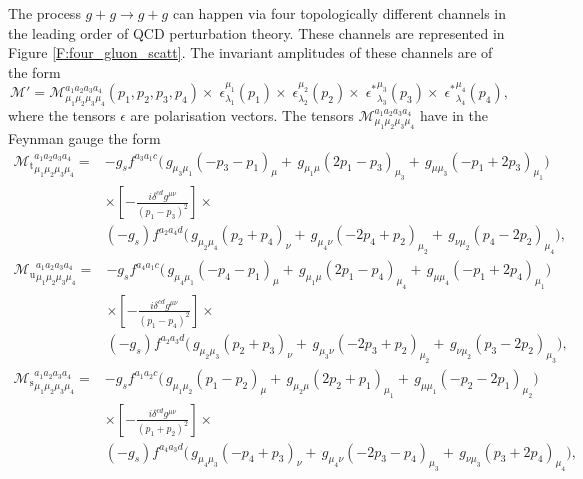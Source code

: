 \documentclass[a4paper, twoside, english, 12pt]{report}
\begin{document}
The process $g+g\rightarrow g+g$ can happen via four topologically different channels in the leading order of QCD perturbation theory. These channels are represented in Figure \ref{F:four_gluon_scatt}. The invariant amplitudes of these channels are of the form
\begin{equation}
\mathcal{M}'=\mathcal{M}_{\mu_1\mu_2\mu_3\mu_4}^{a_1a_2a_3a_4}(p_1,p_2,p_3,p_4)\times\; \epsilon_{\lambda_1}^{\mu_1}(p_1)\times\; \epsilon_{\lambda_2}^{\mu_2}(p_2)\times\; {\epsilon^*}_{\lambda_3}^{\mu_3}(p_3)\times\; {\epsilon^*}_{\lambda_4}^{\mu_4}(p_4),
\end{equation}
where the tensors $\epsilon$ are polarisation vectors. The tensors $\mathcal{M}_{\mu_1\mu_2\mu_3\mu_4}^{a_1a_2a_3a_4}$ have in the Feynman gauge the form
\begin{align*}
{\mathcal{M}_\text{t}}_{\mu_1\mu_2\mu_3\mu_4}^{a_1a_2a_3a_4} = &-g_sf^{a_3a_1c}\Big(\,g_{\mu_3\mu_1}(-{p_3}-{p_1})_{\mu} + \,g_{\mu_1\mu}(2{p_1}-{p_3})_{\mu_3} + \,g_{\mu\mu_3}(-{p_1}+2{p_3})_{\mu_1}\Big) \\
&\times \left[-\frac{i\delta^{cd}g^{\mu\nu}}{(p_1-p_3)^2}\right] \times\\
&(-g_s)f^{a_2a_4d}\Big(\,g_{\mu_2\mu_4}({p_2}+{p_4})_{\nu} + \,g_{\mu_4\nu}(-2{p_4}+{p_2})_{\mu_2} + \,g_{\nu\mu_2}({p_4}-2{p_2})_{\mu_4}\Big),
\end{align*}
\begin{align*}
{\mathcal{M}_\text{u}}_{\mu_1\mu_2\mu_3\mu_4}^{a_1a_2a_3a_4} = &-g_sf^{a_4a_1c}\Big(\,g_{\mu_4\mu_1}(-{p_4}-{p_1})_{\mu} + \,g_{\mu_1\mu}(2{p_1}-{p_4})_{\mu_4} + \,g_{\mu\mu_4}(-{p_1}+2{p_4})_{\mu_1}\Big) \\
&\times \left[-\frac{i\delta^{cd}g^{\mu\nu}}{(p_1-p_4)^2}\right] \times\\
&(-g_s)f^{a_2a_3d}\Big(\,g_{\mu_2\mu_3}({p_2}+{p_3})_{\nu} + \,g_{\mu_3\nu}(-2{p_3}+{p_2})_{\mu_2} + \,g_{\nu\mu_2}({p_3}-2{p_2})_{\mu_3}\Big),
\end{align*}
\begin{align*}
{\mathcal{M}_\text{s}}_{\mu_1\mu_2\mu_3\mu_4}^{a_1a_2a_3a_4} = &-g_sf^{a_1a_2c}\Big(\,g_{\mu_1\mu_2}({p_1}-{p_2})_{\mu} + \,g_{\mu_2\mu}(2{p_2}+{p_1})_{\mu_1} + \,g_{\mu\mu_1}(-{p_2}-2{p_1})_{\mu_2}\Big) \\
&\times \left[-\frac{i\delta^{cd}g^{\mu\nu}}{(p_1+p_2)^2}\right] \times\\
&(-g_s)f^{a_4a_3d}\Big(\,g_{\mu_4\mu_3}(-{p_4}+{p_3})_{\nu} + \,g_{\mu_4\nu}(-2{p_3}-{p_4})_{\mu_3} + \,g_{\nu\mu_3}({p_3}+2{p_4})_{\mu_4}\Big),
\end{align*}
\end{document}
